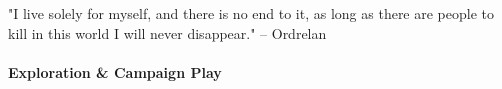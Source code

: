 \begin{multicols}{2}




\begin{snugshade} "I live solely for myself, and there is no end to it, as long as there are people to kill in this world I will never disappear." -- Ordrelan \end{snugshade}


\paragraph{Exploration \& Campaign Play} 

%   
 

% 


\end{multicols}
